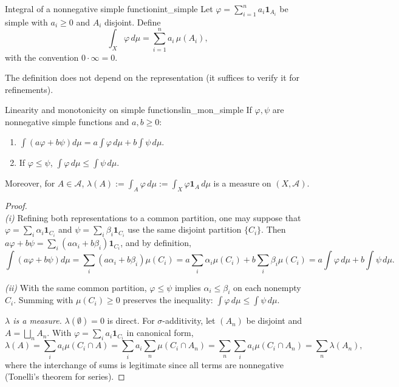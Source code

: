 \documentclass[11pt, a4paper]{article}
\begin{document}
\begin{definicion}{Integral of a nonnegative simple function}{int_simple}
Let $\varphi = \sum_{i=1}^n a_i \mathbf{1}_{A_i}$ be simple with $a_i \ge 0$ and $A_i$ disjoint.
Define
$$ \int_X \varphi \, d\mu = \sum_{i=1}^n a_i \, \mu(A_i), $$
with the convention $0 \cdot \infty = 0$.
\end{definicion}

\obs The definition does not depend on the representation (it suffices to verify it for refinements).

\begin{proposicion}{Linearity and monotonicity on simple functions}{lin_mon_simple}
If $\varphi, \psi$ are nonnegative simple functions and $a, b \ge 0$:
\begin{enumerate}
    \item $\int (a \varphi + b \psi) d\mu = a \int \varphi \, d\mu + b \int \psi \, d\mu$.
    \item If $\varphi \le \psi$, $\int \varphi \, d\mu \le \int \psi \, d\mu$.
\end{enumerate}
Moreover, for $A \in \mathcal{A}$, $\lambda(A) := \int_A \varphi \, d\mu := \int_X \varphi
\mathbf{1}_A \, d\mu$ is a measure on $(X, \mathcal{A})$.
\end{proposicion}

\begin{proof}\leavevmode\\
\textit{(i)} Refining both representations to a common partition, one may suppose that
$\varphi = \sum_i \alpha_i \mathbf{1}_{C_i}$ and $\psi = \sum_i \beta_i \mathbf{1}_{C_i}$ use the
same disjoint partition $\{C_i\}$. Then $a \varphi + b \psi = \sum_i (a \alpha_i + b
\beta_i) \mathbf{1}_{C_i}$, and by definition,
$$ \int (a \varphi + b \psi) d\mu = \sum_i (a \alpha_i + b \beta_i) \mu(C_i) = a \sum_i \alpha_i
\mu(C_i) + b \sum_i \beta_i \mu(C_i) = a \int \varphi \, d\mu + b \int \psi \, d\mu. $$

\textit{(ii)} With the same common partition, $\varphi \le \psi$ implies $\alpha_i \le \beta_i$
on each nonempty $C_i$. Summing with $\mu(C_i) \ge 0$ preserves the inequality:
$\int \varphi \, d\mu \le \int \psi \, d\mu$.

\textit{$\lambda$ is a measure.} $\lambda(\emptyset) = 0$ is direct. For $\sigma$-additivity,
let $(A_n)$ be disjoint and $A = \bigsqcup_n A_n$. With $\varphi = \sum_i a_i \mathbf{1}_{C_i}$
in canonical form,
$$ \lambda(A) = \sum_i a_i \mu(C_i \cap A) = \sum_i a_i \sum_n \mu(C_i \cap A_n) =
\sum_n \sum_i a_i \mu(C_i \cap A_n) = \sum_n \lambda(A_n), $$
where the interchange of sums is legitimate since all terms are nonnegative (Tonelli's
theorem for series).
\end{proof}
\end{document}
